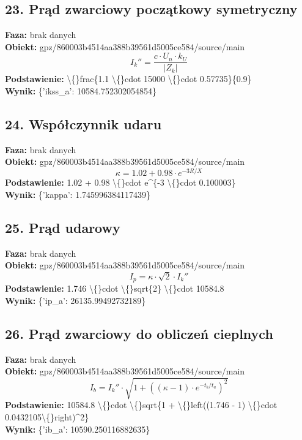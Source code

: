 ﻿\documentclass[11pt]{article}
\begin{document}
\subsection*{23. Prąd zwarciowy początkowy symetryczny}
\textbf{Faza:} brak danych\\
\textbf{Obiekt:} gpz/860003b4514aa388b39561d5005ce584/source/main\\
\[
I_{k}'' = \frac{c \cdot U_n \cdot k_U}{\left|Z_k\right|}
\]
\textbf{Podstawienie:} \textbackslash\{\}frac\{1.1 \textbackslash\{\}cdot 15000 \textbackslash\{\}cdot 0.57735\}\{0.9\}\\
\textbf{Wynik:} \{'ikss\_a': 10584.752302054854\}\\
\subsection*{24. Współczynnik udaru}
\textbf{Faza:} brak danych\\
\textbf{Obiekt:} gpz/860003b4514aa388b39561d5005ce584/source/main\\
\[
\kappa = 1.02 + 0.98 \cdot e^{-3 R/X}
\]
\textbf{Podstawienie:} 1.02 + 0.98 \textbackslash\{\}cdot e\textasciicircum{}\{-3 \textbackslash\{\}cdot 0.100003\}\\
\textbf{Wynik:} \{'kappa': 1.745996384117439\}\\
\subsection*{25. Prąd udarowy}
\textbf{Faza:} brak danych\\
\textbf{Obiekt:} gpz/860003b4514aa388b39561d5005ce584/source/main\\
\[
I_p = \kappa \cdot \sqrt{2} \cdot I_{k}''
\]
\textbf{Podstawienie:} 1.746 \textbackslash\{\}cdot \textbackslash\{\}sqrt\{2\} \textbackslash\{\}cdot 10584.8\\
\textbf{Wynik:} \{'ip\_a': 26135.99492732189\}\\
\subsection*{26. Prąd zwarciowy do obliczeń cieplnych}
\textbf{Faza:} brak danych\\
\textbf{Obiekt:} gpz/860003b4514aa388b39561d5005ce584/source/main\\
\[
I_b = I_{k}'' \cdot \sqrt{1 + ((\kappa - 1) \cdot e^{-t_b/t_a})^2}
\]
\textbf{Podstawienie:} 10584.8 \textbackslash\{\}cdot \textbackslash\{\}sqrt\{1 + \textbackslash\{\}left((1.746 - 1) \textbackslash\{\}cdot 0.0432105\textbackslash\{\}right)\textasciicircum{}2\}\\
\textbf{Wynik:} \{'ib\_a': 10590.250116882635\}\\
\end{document}
